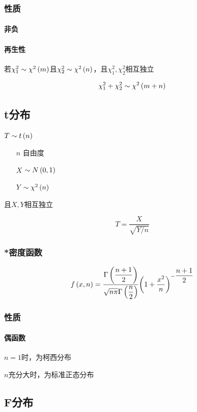 \documentclass{article}
\begin{document}
\subsubsection{性质}

\paragraph{非负}

\paragraph{再生性}

若$\chi_1^2\sim\chi^2\left(m\right)$且$\chi_2^2\sim\chi^2\left(n\right)$，且$\chi_1^2,\chi_2^2$相互独立

\[\chi_1^2+\chi_2^2\sim\chi^2\left(m+n\right)\]

\subsection{t分布}

$T\sim t\left(n\right)$

\begin{enumerate}
    \item [$n$] 自由度
    \item [$X$] $\sim N\left(0,1\right)$
    \item [$Y$] $\sim\chi^2\left(n\right)$
\end{enumerate}

且$X,Y$相互独立

\[T=\frac{X}{\sqrt{Y/n}}\]

\subsubsection{*密度函数}

\[f\left(x,n\right)=\frac{\Gamma\left(\dfrac{n+1}2\right)}{\sqrt{n\pi}\Gamma\left(\dfrac n2\right)}{\left(1+\frac{x^2}n\right)}^{-\dfrac{n+1}2}\]

\subsubsection{性质}

\paragraph{偶函数}

$n=1$时，为柯西分布

$n$充分大时，为标准正态分布

\subsection{F分布}
\end{document}
